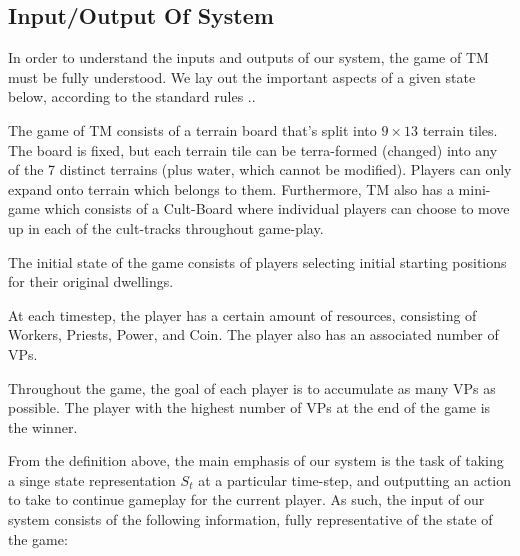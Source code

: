 \documentclass[12pt,twocolumn,letterpaper]{article}
\begin{document}
\subsection{Input/Output Of System}
\label{subsection:input/output_of_system}
In order to understand the inputs and outputs of our system, the game of TM must be fully understood. We lay out the important aspects of a given state below, according to the standard rules \cite{TMRules}..

The game of TM consists of a terrain board that's split into $9 \times 13$ terrain tiles. The board is fixed, but each terrain tile can be terra-formed (changed) into any of the 7 distinct terrains (plus water, which cannot be modified). Players can only expand onto terrain which belongs to them. Furthermore, TM also has a mini-game which consists of a Cult-Board where individual players can choose to move up in each of the cult-tracks throughout game-play. 

The initial state of the game consists of players selecting initial starting positions for their original dwellings. 

At each timestep, the player has a certain amount of resources, consisting of Workers, Priests, Power, and Coin. The player also has an associated number of VPs.

Throughout the game, the goal of each player is to accumulate as many VPs as possible. The player with the highest number of VPs at the end of the game is the winner.

From the definition above, the main emphasis of our system is the task of taking a singe state representation $S_t$ at a particular time-step, and outputting an action to take to continue gameplay for the current player. As such, the input of our system consists of the following information, fully representative of the state of the game:
\end{document}
